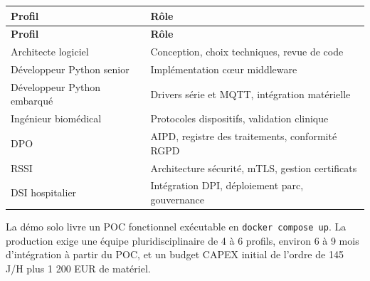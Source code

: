 \bridgezebra
\begin{longtable}{p{4.5cm}p{9.5cm}}
  \toprule
  \rowcolor{bridgeblue!90}
  {\color{white}\bfseries Profil} & {\color{white}\bfseries Rôle} \\
  \midrule
  \endfirsthead
  \toprule
  \rowcolor{bridgeblue!90}
  {\color{white}\bfseries Profil} & {\color{white}\bfseries Rôle} \\
  \midrule
  \endhead
  \bottomrule
  \endfoot
  Architecte logiciel              & Conception, choix techniques, revue de code \\
  Développeur Python senior        & Implémentation cœur middleware \\
  Développeur Python embarqué      & Drivers série et MQTT, intégration matérielle \\
  Ingénieur biomédical             & Protocoles dispositifs, validation clinique \\
  DPO                              & AIPD, registre des traitements, conformité RGPD \\
  RSSI                             & Architecture sécurité, mTLS, gestion certificats \\
  DSI hospitalier                  & Intégration DPI, déploiement parc, gouvernance \\
\end{longtable}

\begin{bridgeinfo}
La démo solo livre un POC fonctionnel exécutable en \texttt{docker compose up}. La production exige une équipe pluridisciplinaire de 4 à 6 profils, environ 6 à 9 mois d'intégration à partir du POC, et un budget CAPEX initial de l'ordre de 145 J/H plus 1 200 EUR de matériel.
\end{bridgeinfo}
